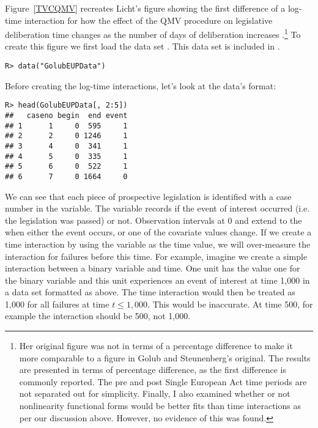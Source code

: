 \documentclass[nojss]{jss}\usepackage[]{graphicx}\usepackage[]{color}
\makeatletter
\newenvironment{kframe}{%
 \def\at@end@of@kframe{}%
 \ifinner\ifhmode%
  \def\at@end@of@kframe{\end{minipage}}%
  \begin{minipage}{\columnwidth}%
 \fi\fi%
 \def\FrameCommand##1{\hskip\@totalleftmargin \hskip-\fboxsep
 \colorbox{shadecolor}{##1}\hskip-\fboxsep
     \hskip-\linewidth \hskip-\@totalleftmargin \hskip\columnwidth}%
 \MakeFramed {\advance\hsize-\width
   \@totalleftmargin\z@ \linewidth\hsize
   \@setminipage}}%
 {\par\unskip\endMakeFramed%
 \at@end@of@kframe}
\newenvironment{knitrout}{}{} %
\makeatother
\begin{document}
Figure~\ref{TVCQMV} recreates Licht's \citeyearpar{Licht2011} figure showing the first difference of a log-time interaction for how the effect of the QMV procedure on legislative deliberation time changes as the number of days of deliberation increases \citep[see][p. 236]{Licht2011}.\footnote{Her original figure was not in terms of a percentage difference to make it more comparable to a figure in Golub and Steunenberg's original. The results are presented in terms of percentage difference, as the first difference is commonly reported. The pre and post Single European Act time periods are not separated out for simplicity. Finally, I also examined whether or not nonlinearity functional forms would be better fits than time interactions as per our discussion above. However, no evidence of this was found.} To create this figure we first load the data set . This data set is included in .

\begin{knitrout}
\color{fgcolor}\begin{kframe}
\begin{verbatim}
R> data("GolubEUPData")
\end{verbatim}
\end{kframe}
\end{knitrout}

Before creating the log-time interactions, let's look at the data's format:

\begin{knitrout}
\color{fgcolor}\begin{kframe}
\begin{verbatim}
R> head(GolubEUPData[, 2:5])
##   caseno begin  end event
## 1      1     0  595     1
## 2      2     0 1246     1
## 3      4     0  341     1
## 4      5     0  335     1
## 5      6     0  522     1
## 6      7     0 1664     0
\end{verbatim}
\end{kframe}
\end{knitrout}

We can see that each piece of prospective legislation is identified with a case number in the  variable. The  variable records if the event of interest occurred (i.e. the legislation was passed) or not. Observation intervals  at 0 and extend to the  when either the event occurs, or one of the covariate values change. If we create a time interaction by using the  variable as the time value, we will over-measure the interaction for failures before this time. For example, imagine we create a simple interaction between a binary variable and time. One unit has the value one for the binary variable and this unit experiences an event of interest at time 1,000 in a data set formatted as above. The time interaction would then be treated as 1,000 for all failures at time $t \leq 1,000$. This would be inaccurate. At time 500, for example the interaction should be 500, not 1,000.
\end{document}
